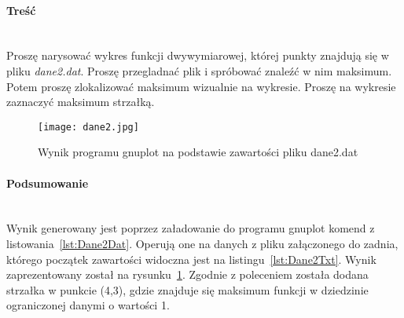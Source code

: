 \paragraph{Treść}~\\
Proszę narysować wykres funkcji dwywymiarowej, której punkty znajdują się w pliku \textit{dane2.dat}.
Proszę przegladnać plik i spróbować znaleźć w nim maksimum.
Potem proszę zlokalizować maksimum wizualnie na wykresie.
Proszę na wykresie zaznaczyć maksimum strzałką.





\begin{figure}[h]
  \caption{Wynik programu gnuplot na podstawie zawartości pliku dane2.dat}
  \label{fig:Dane2Jpg}
  \centering
  \texttt{[image: dane2.jpg]}
\end{figure}

\paragraph{Podsumowanie}~\\
Wynik generowany jest poprzez załadowanie do programu gnuplot komend z listowania~\ref{lst:Dane2Dat}.
Operują one na danych z pliku załączonego do zadnia, którego początek zawartości widoczna jest na listingu~\ref{lst:Dane2Txt}.
Wynik zaprezentowany został na rysunku~\ref{fig:Dane2Jpg}.
Zgodnie z poleceniem została dodana strzałka w punkcie (4,3), gdzie znajduje się maksimum funkcji w dziedzinie ograniczonej danymi o wartości 1.
